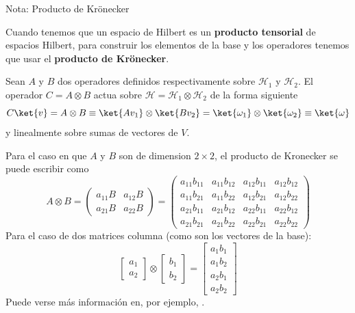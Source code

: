 \documentclass[a4paper,11pt]{book} %
\numberwithin{equation}{chapter}
\def\lp{\left(}
\def\rp{\right)}
\begin{document}
	\begin{mybox_blue}{Nota: Producto de Krönecker}
	
	Cuando tenemos que un espacio de Hilbert es un \textbf{producto tensorial} de espacios Hilbert, para construir los
	elementos de la base y los operadores tenemos que usar el \textbf{producto de Krönecker}. 
	
	Sean $A$ y $B$ dos operadores definidos respectivamente sobre $\mathcal{H}_1$ y $\mathcal{H}_2$. El operador 
	$C=A \otimes B$ actua sobre $\mathcal{H} = \mathcal{H}_1 \otimes \mathcal{H}_2$ de la forma siguiente
	\begin{equation} \label{ec_multiqubit_C=AxB_1}
	C \ket{v} = A \otimes B \equiv \ket{Av_1} \otimes \ket{Bv_2} = \ket{\omega_1} \otimes \ket{\omega_2} \equiv \ket{\omega}
	\end{equation}
	y linealmente sobre sumas de vectores de $V$. 
	
	Para el caso en que $A$ y $B$ son de dimension $2\times 2$, el producto de Kronecker se puede escribir como
	\begin{equation}
	A \otimes B = \lp \begin{matrix}
	a_{11} B & a_{12} B \\
	a_{21} B & a_{22} B
	\end{matrix}	 \rp = 
	\lp \begin{matrix}
	a_{11} b_{11} & a_{11} b_{12} & a_{12} b_{11} & a_{12}b_{12} \\
	a_{11} b_{21} & a_{11} b_{22} & a_{12} b_{21} & a_{12}b_{22} \\
	a_{21} b_{11} & a_{21} b_{12} & a_{22} b_{11} & a_{22}b_{12} \\
	a_{21} b_{21} & a_{21} b_{22} & a_{22} b_{21} & a_{22}b_{22} 
	\end{matrix} \rp
	\end{equation}
	Para el caso de dos matrices columna (como son los vectores de la base):
	\begin{equation}	
	\begin{bmatrix} a_1 \\ a_2 \end{bmatrix} \otimes \begin{bmatrix} b_1 \\ b_2 \end{bmatrix} = 
	\begin{bmatrix} a_1 b_1 \\ a_1 b_2 \\ a_2 b_1 \\ a_2 b_2	\end{bmatrix}
	\end{equation}
	Puede verse más información en, por ejemplo, \cite{bib_wiki_kronecker}.
	\end{mybox_blue}
\end{document}
